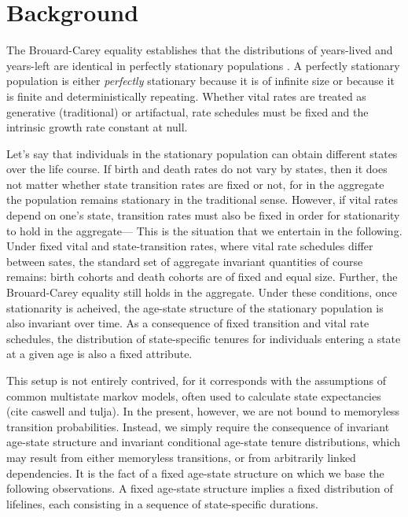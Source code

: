 \documentclass[12pt,oneside,a4paper]{article}
\theoremstyle{definition}
\begin{document}
\section{Background}
The Brouard-Carey equality establishes that the distributions of years-lived and years-left are identical in perfectly
stationary populations
\citep{brouard1989mouvements,Vaupel2009,rao2014,villavicencioRiffeSymmetires2016}.
A perfectly stationary population is either \emph{perfectly} stationary because it is
of infinite size or because it is finite and
deterministically repeating. Whether vital rates are treated as generative (traditional) or artifactual, rate schedules must be fixed and the intrinsic growth rate
constant at null.

Let's say that individuals in
the stationary population can obtain different states over the life course. If
birth and death rates do not vary by states, then it does not matter whether
state transition rates are fixed or not, for in the aggregate the population remains
stationary in the traditional sense. However, if vital rates depend on one's
state, transition rates must also be fixed in order for stationarity to
hold in the aggregate--- This is the situation that we entertain in the
following. Under fixed vital and state-transition rates, where vital rate
schedules differ between sates, the standard set of aggregate invariant
quantities of course remains:
birth cohorts and death cohorts are of fixed and equal size. Further, the
Brouard-Carey equality still holds in the aggregate. Under these conditions,
once stationarity is acheived, the age-state structure of the stationary
population is also invariant over time. As a consequence of fixed transition
and vital rate schedules, the distribution of state-specific tenures for
individuals entering a state at a given age is also a fixed attribute.

This setup is not entirely contrived, for it corresponds with the assumptions of
common multistate markov models, often used to calculate state expectancies
(cite caswell and tulja).
In the present, however, we are not bound to memoryless transition probabilities.
Instead, we simply require the consequence of invariant age-state structure and
invariant conditional age-state tenure distributions, which may result from
either memoryless transitions, or from arbitrarily linked
dependencies.
It is the fact of a fixed age-state structure on which we base the following observations.
A fixed age-state structure implies a fixed distribution of lifelines, each
consisting in a sequence of state-specific durations. 
\end{document}
